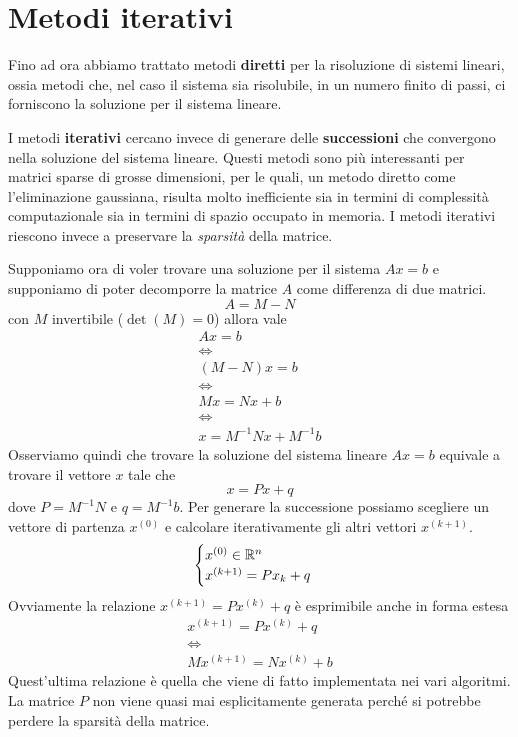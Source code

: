 \chapter{Metodi iterativi}
Fino ad ora abbiamo trattato metodi \textbf{diretti} per la risoluzione di sistemi lineari, ossia metodi che,
nel caso il sistema sia risolubile, in un numero finito di passi, ci forniscono la soluzione per il sistema
lineare.

I metodi \textbf{iterativi} cercano invece di generare delle \textbf{successioni} che convergono nella soluzione
del sistema lineare. Questi metodi sono più interessanti per matrici sparse di grosse dimensioni, per le quali,
un metodo diretto come l'eliminazione gaussiana, risulta molto inefficiente sia in termini di complessità
computazionale sia in termini di spazio occupato in memoria. I metodi iterativi riescono invece a preservare la
\emph{sparsità} della matrice.

Supponiamo ora di voler trovare una soluzione per il sistema $Ax = b$ e supponiamo di poter decomporre la matrice
$A$ come differenza di due matrici.
\[ A = M - N \]
con $M$ invertibile ($\det(M) = 0$) allora vale
\begin{gather*}
	Ax = b \\
	\Leftrightarrow \\
	(M - N) x = b \\
	\Leftrightarrow \\
	M x = N x + b \\
	\Leftrightarrow \\
	x = M^{-1} N x + M^{-1} b
\end{gather*}
Osserviamo quindi che trovare la soluzione del sistema lineare $Ax = b$ equivale a trovare il vettore $x$ tale che
\[ x = Px + q \]
dove $P = M^{-1} N$ e $q = M^{-1} b$. Per generare la successione possiamo scegliere un vettore di partenza
$x^{(0)}$ e calcolare iterativamente gli altri vettori $x^{(k+1)}$.
\[
	\begin{cases}
		x^{(0)} \in \mathbb{R}^n \\
		x^{(k+1)} = P x_k + q
	\end{cases}
\]
Ovviamente la relazione $x^{(k+1)} = P x^{(k)} + q$ è esprimibile anche in forma estesa
\begin{gather*}
	x^{(k+1)} = P x^{(k)} + q \\
	\Leftrightarrow         \\
	M x^{(k+1)} = N x^{(k)} + b
\end{gather*}
Quest'ultima relazione è quella che viene di fatto implementata nei vari algoritmi. La matrice $P$ non viene quasi
mai esplicitamente generata perché si potrebbe perdere la sparsità della matrice.

